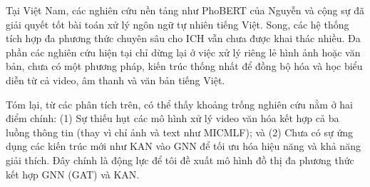 Tại Việt Nam, các nghiên cứu nền tảng như PhoBERT của Nguyễn và cộng sự \cite{nguyen-tuan-nguyen-2020-phobert} đã giải quyết tốt bài toán xử lý ngôn ngữ tự nhiên tiếng Việt. Song, các hệ thống tích hợp đa phương thức chuyên sâu cho ICH vẫn chưa được khai thác nhiều. Đa phần các nghiên cứu hiện tại chỉ dừng lại ở việc xử lý riêng lẻ hình ảnh hoặc văn bản, chưa có một phương pháp, kiến trúc thống nhất để đồng bộ hóa và học biểu diễn từ cả video, âm thanh và văn bản tiếng Việt.\vspace{0.3cm}

Tóm lại, từ các phân tích trên, có thể thấy khoảng trống nghiên cứu nằm ở hai điểm chính: (1) Sự thiếu hụt các mô hình xử lý video văn hóa kết hợp cả ba luồng thông tin (thay vì chỉ ảnh và text như MICMLF); và (2) Chưa có sự ứng dụng các kiến trúc mới như KAN vào GNN để tối ưu hóa hiệu năng và khả năng giải thích. Đây chính là động lực để tôi đề xuất mô hình đồ thị đa phương thức kết hợp GNN (GAT) và KAN.